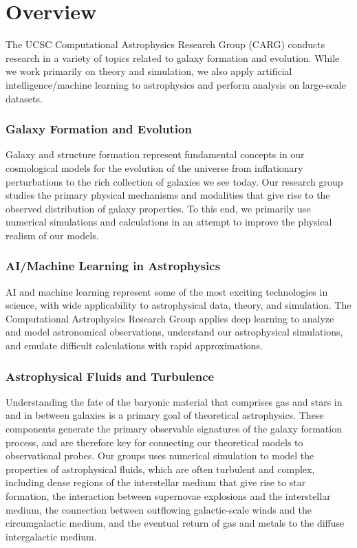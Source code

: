 \section{Overview}
\label{sec:overview}

The UCSC Computational Astrophysics Research Group (CARG) conducts research in a variety of topics related to galaxy formation and evolution. While we work primarily on theory and simulation, we also apply artificial intelligence/machine learning to astrophysics and perform analysis on large-scale datasets.


\subsubsection{Galaxy Formation and Evolution}
Galaxy and structure formation represent fundamental concepts in our cosmological models for the evolution of the universe from inflationary perturbations to the rich collection of galaxies we see today. Our research group studies the primary physical mechanisms and modalities that give rise to the observed distribution of galaxy properties. To this end, we primarily use numerical simulations and calculations in an attempt to improve the physical realism of our models.

\subsubsection{AI/Machine Learning in Astrophysics}
AI and machine learning represent some of the most exciting technologies in science, with wide applicability to astrophysical data, theory, and simulation. The Computational Astrophysics Research Group applies deep learning to analyze and model astronomical observations, understand our astrophysical simulations, and emulate difficult calculations with rapid approximations.

\subsubsection{Astrophysical Fluids and Turbulence}
Understanding the fate of the baryonic material that comprises gas and stars in and in between galaxies is a primary goal of theoretical astrophysics. These components generate the primary observable signatures of the galaxy formation process, and are therefore key for connecting our theoretical models to observational probes. Our groups uses numerical simulation to model the properties of astrophysical fluids, which are often turbulent and complex, including dense regions of the interstellar medium that give rise to star formation, the interaction between supernovae explosions and the interstellar medium, the connection between outflowing galactic-scale winds and the circumgalactic medium, and the eventual return of gas and metals to the diffuse intergalactic medium.


